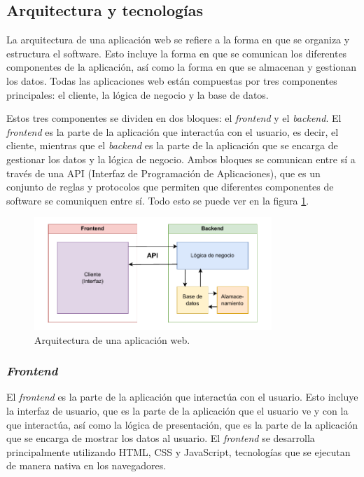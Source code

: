 \subsection{Arquitectura y tecnologías}

La arquitectura de una aplicación web se refiere a la forma en que se organiza y estructura el software. Esto incluye la forma en que se comunican los diferentes componentes de la aplicación, así como la forma en que se almacenan y gestionan los datos. Todas las aplicaciones web están compuestas por tres componentes principales: el cliente, la lógica de negocio y la base de datos.

Estos tres componentes se dividen en dos bloques: el \textit{frontend} y el \textit{backend}. El \textit{frontend} es la parte de la aplicación que interactúa con el usuario, es decir, el cliente, mientras que el \textit{backend} es la parte de la aplicación que se encarga de gestionar los datos y la lógica de negocio. Ambos bloques se comunican entre sí a través de una API (Interfaz de Programación de Aplicaciones), que es un conjunto de reglas y protocolos que permiten que diferentes componentes de software se comuniquen entre sí. Todo esto se puede ver en la figura \ref{fig:arquitectura_web}.

\begin{figure}
    \centering
    \includegraphics[width=0.8\textwidth]{figures/theoric_frame/arquitectura_web.pdf}
    \caption{Arquitectura de una aplicación web.}
    \label{fig:arquitectura_web}
\end{figure}

\subsubsection{\textit{Frontend}}

El \textit{frontend} es la parte de la aplicación que interactúa con el usuario. Esto incluye la interfaz de usuario, que es la parte de la aplicación que el usuario ve y con la que interactúa, así como la lógica de presentación, que es la parte de la aplicación que se encarga de mostrar los datos al usuario. El \textit{frontend} se desarrolla principalmente utilizando HTML, CSS y JavaScript, tecnologías que se ejecutan de manera nativa en los navegadores.


